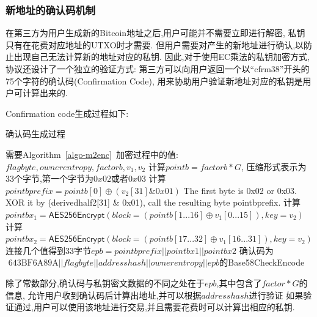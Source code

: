 \subsubsection{新地址的确认码机制}

在第三方为用户生成新的Bitcoin地址之后,用户可能并不需要立即进行解密,
私钥只有在花费对应地址的UTXO时才需要.
但用户需要对产生的新地址进行确认,以防止出现自己无法计算新的地址对应的私钥.
因此,对于使用EC乘法的私钥加密方式,协议还设计了一个独立的验证方式:
第三方可以向用户返回一个以“cfrm38”开头的75个字符的确认码(Confirmation Code),
用来协助用户验证新地址对应的私钥是用户可计算出来的.
 
Confirmation code生成过程如下:

\begin{algorithm}[h]\footnotesize
\caption{确认码生成过程}\label{algo-ccgen}
  	\begin{algorithmic}[1]
	   	\STATE 需要Algorithm~\ref{algo-m2enc}~加密过程中的值:$flagbyte, ownerentropy, factorb, v_1, v_2$
		\STATE 计算$pointb = factorb * G$, 压缩形式表示为33个字节,第一个字节为$0x02$或者$0x03$
		\STATE 计算$pointbprefix = pointb[0] \oplus (v_2[31] \& 0x01)$
		 The first byte is 0x02 or 0x03. XOR it by (derivedhalf2[31] \& 0x01), call the resulting byte pointbprefix.
		\STATE 计算$pointbx_1 = \textsf{AES256Encrypt}(block = (pointb[1...16] \oplus v_1[0...15]), key = v_2)$ 
		\STATE 计算$pointbx_2=\textsf{AES256Encrypt}(block = (pointb[17...32] \oplus v_1[16...31]),key = v_2)$
		\STATE 连接几个值得到33字节$epb = pointbprefix || pointbx1 || pointbx2$
		\STATE 确认码为\small{$\text{ 643BF6A89A} || flagbyte || addresshash || ownerentropy || epb$}的\textsf{Base58CheckEncode}
\end{algorithmic}
\end{algorithm}

除了常数部分,确认码与私钥密文数据的不同之处在于$epb$,其中包含了$factor*G$的信息,
允许用户收到确认码后计算出地址,并可以根据$addresshash$进行验证
如果验证通过,用户可以使用该地址进行交易,并且需要花费时可以计算出相应的私钥.




